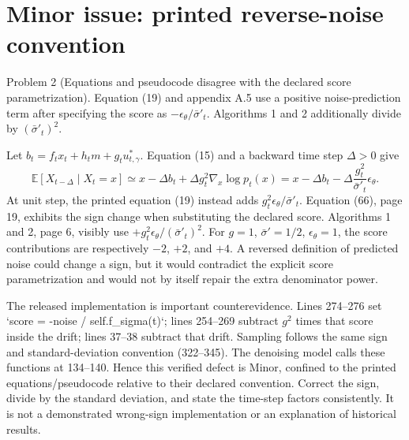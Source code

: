 \documentclass[10pt]{article}
\begin{document}
\section*{Minor issue: printed reverse-noise convention}
Problem 2 (Equations and pseudocode disagree with the declared score parametrization).  Equation (19) and appendix A.5 use a positive noise-prediction term after specifying the score as \(-\epsilon_\theta/\bar\sigma'_t\). Algorithms 1 and 2 additionally divide by \((\bar\sigma'_t)^2\).\par
Let \(b_t=f_tx_t+h_tm+g_tu^*_{t,\gamma}\). Equation (15) and a backward time step \(\Delta>0\) give \[\mathbb E[X_{t-\Delta}\mid X_t=x]
 \simeq x-\Delta b_t+\Delta g_t^2\nabla_x\log p_t(x)
 =x-\Delta b_t-\Delta\frac{g_t^2}{\bar\sigma'_t}\epsilon_\theta.\] At unit step, the printed equation (19) instead adds \(g_t^2\epsilon_\theta/\bar\sigma'_t\). Equation (66), page 19, exhibits the sign change when substituting the declared score. Algorithms 1 and 2, page 6, visibly use \(+g_t^2\epsilon_\theta/(\bar\sigma'_t)^2\). For \(g=1\), \(\bar\sigma'=1/2\), \(\epsilon_\theta=1\), the score contributions are respectively \(-2\), \(+2\), and \(+4\). A reversed definition of predicted noise could change a sign, but it would contradict the explicit score parametrization and would not by itself repair the extra denominator power.\par
The released implementation is important counterevidence. Lines 274–276 set `score = -noise / self.f\_sigma(t)`; lines 254–269 subtract \(g^2\) times that score inside the drift; lines 37–38 subtract that drift. Sampling follows the same sign and standard-deviation convention (322–345). The denoising model calls these functions at 134–140. Hence this verified defect is Minor, confined to the printed equations/pseudocode relative to their declared convention. Correct the sign, divide by the standard deviation, and state the time-step factors consistently. It is not a demonstrated wrong-sign implementation or an explanation of historical results.\par
\end{document}

